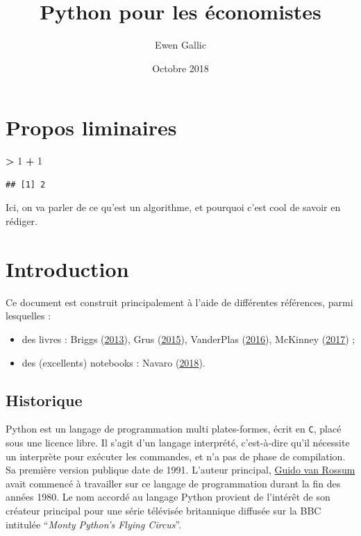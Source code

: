 \documentclass[12pt,]{book}
\title{Python pour les économistes}
\author{Ewen Gallic}
\date{Octobre 2018}
\newenvironment{Shaded}{\begin{snugshade}}{\end{snugshade}}
\newcommand{\DecValTok}[1]{\textcolor[rgb]{0.00,0.00,0.81}{#1}}
\newcommand{\StringTok}[1]{\textcolor[rgb]{0.31,0.60,0.02}{#1}}
\newcommand{\OperatorTok}[1]{\textcolor[rgb]{0.81,0.36,0.00}{\textbf{#1}}}
\providecommand{\tightlist}{%
  \setlength{\itemsep}{0pt}\setlength{\parskip}{0pt}}
\numberwithin{equation}{section}
\numberwithin{countremarque}{section}
\begin{document}
\maketitle

{
\hypersetup{linkcolor=black}
\setcounter{tocdepth}{1}
\tableofcontents
}
\listoftables
\listoffigures
\chapter*{Propos liminaires}\label{propos-liminaires}

\begin{Shaded}
\begin{Highlighting}[]
\OperatorTok{>}\StringTok{ }\DecValTok{1} \OperatorTok{+}\StringTok{ }\DecValTok{1}
\end{Highlighting}
\end{Shaded}

\begin{lstlisting}
## [1] 2
\end{lstlisting}

Ici, on va parler de ce qu'est un algorithme, et pourquoi c'est cool de
savoir en rédiger.

\chapter{Introduction}\label{introduction}

Ce document est construit principalement à l'aide de différentes
références, parmi lesquelles :

\begin{itemize}
\tightlist
\item
  des livres : Briggs
  (\protect\hyperlink{ref-briggs_2013_python}{2013}), Grus
  (\protect\hyperlink{ref-grus_2015_data}{2015}), VanderPlas
  (\protect\hyperlink{ref-vanderplas2016python}{2016}), McKinney
  (\protect\hyperlink{ref-mckinney_2017_python}{2017}) ;
\item
  des (excellents) notebooks : Navaro
  (\protect\hyperlink{ref-navaro_python}{2018}).
\end{itemize}

\section{Historique}\label{historique}

Python est un langage de programmation multi plates-formes, écrit en
\texttt{C}, placé sous une licence libre. Il s'agit d'un langage
interprété, c'est-à-dire qu'il nécessite un interprète pour exécuter les
commandes, et n'a pas de phase de compilation. Sa première version
publique date de 1991. L'auteur principal,
\href{https://en.wikipedia.org/wiki/Guido_van_Rossum}{Guido van Rossum}
avait commencé à travailler sur ce langage de programmation durant la
fin des années 1980. Le nom accordé au langage Python provient de
l'intérêt de son créateur principal pour une série télévisée britannique
diffusée sur la BBC intitulée ``\emph{Monty Python's Flying Circus}''.
\end{document}
